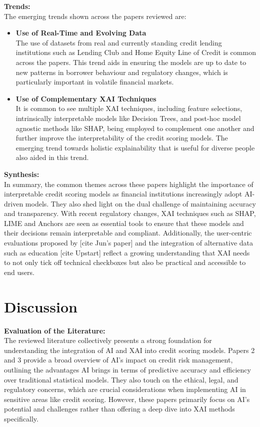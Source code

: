 \documentclass[12pt,a4paper]{article}
\begin{document}
\textbf{Trends:}\\
The emerging trends shown across the papers reviewed are:
\begin{itemize}
    \vspace{-1em}
    \item \textbf{Use of Real-Time and Evolving Data}\\
    The use of datasets from real and currently standing credit lending institutions such as Lending Club and Home Equity Line of Credit is common across the papers. This trend aids in ensuring the models are up to date to new patterns in borrower behaviour and regulatory changes, which is particularly important in volatile financial markets.
    \item \textbf{Use of Complementary XAI Techniques}\\
    It is common to see multiple XAI techniques, including feature selections, intrinsically interpretable models like Decision Trees, and post-hoc model agnostic methods like SHAP, being employed to complement one another and further improve the interpretability of the credit scoring models. The emerging trend towards holistic explainability that is useful for diverse people also aided in this trend.
\end{itemize}

\textbf{Synthesis:}\\
In summary, the common themes across these papers highlight the importance of interpretable credit scoring models as financial institutions increasingly adopt AI-driven models. They also shed light on the dual challenge of maintaining accuracy and transparency. With recent regulatory changes, XAI techniques such as SHAP, LIME and Anchors are seen as essential tools to ensure that these models and their decisions remain interpretable and compliant. Additionally, the user-centric evaluations proposed by [cite Jun’s paper] and the integration of alternative data such as education [cite Upstart] reflect a growing understanding that XAI needs to not only tick off technical checkboxes but also be practical and accessible to end users.


\section{Discussion}
\vspace{-1em}
\textbf{Evaluation of the Literature:}\\
The reviewed literature collectively presents a strong foundation for understanding the integration of AI and XAI into credit scoring models. Papers 2 and 3 provide a broad overview of AI's impact on credit risk management, outlining the advantages AI brings in terms of predictive accuracy and efficiency over traditional statistical models. They also touch on the ethical, legal, and regulatory concerns, which are crucial considerations when implementing AI in sensitive areas like credit scoring. However, these papers primarily focus on AI’s potential and challenges rather than offering a deep dive into XAI methods specifically.
\end{document}
